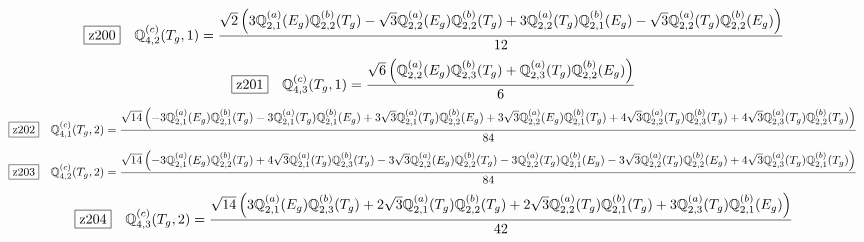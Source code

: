 \documentclass[fleqn,10pt,landscape]{jsarticle}
\begin{document}
\begin{dmath*}
\hspace*{3mm}\fbox{z200}\quad \mathbb{Q}_{4,2}^{(c)}(T_{g},1)=\frac{\sqrt{2} \left(3 \mathbb{Q}_{2,1}^{(a)}(E_{g}) \mathbb{Q}_{2,2}^{(b)}(T_{g}) - \sqrt{3} \mathbb{Q}_{2,2}^{(a)}(E_{g}) \mathbb{Q}_{2,2}^{(b)}(T_{g}) + 3 \mathbb{Q}_{2,2}^{(a)}(T_{g}) \mathbb{Q}_{2,1}^{(b)}(E_{g}) - \sqrt{3} \mathbb{Q}_{2,2}^{(a)}(T_{g}) \mathbb{Q}_{2,2}^{(b)}(E_{g})\right)}{12}
\end{dmath*}
\begin{dmath*}
\hspace*{3mm}\fbox{z201}\quad \mathbb{Q}_{4,3}^{(c)}(T_{g},1)=\frac{\sqrt{6} \left(\mathbb{Q}_{2,2}^{(a)}(E_{g}) \mathbb{Q}_{2,3}^{(b)}(T_{g}) + \mathbb{Q}_{2,3}^{(a)}(T_{g}) \mathbb{Q}_{2,2}^{(b)}(E_{g})\right)}{6}
\end{dmath*}
\begin{dmath*}
\hspace*{3mm}\fbox{z202}\quad \mathbb{Q}_{4,1}^{(c)}(T_{g},2)=\frac{\sqrt{14} \left(- 3 \mathbb{Q}_{2,1}^{(a)}(E_{g}) \mathbb{Q}_{2,1}^{(b)}(T_{g}) - 3 \mathbb{Q}_{2,1}^{(a)}(T_{g}) \mathbb{Q}_{2,1}^{(b)}(E_{g}) + 3 \sqrt{3} \mathbb{Q}_{2,1}^{(a)}(T_{g}) \mathbb{Q}_{2,2}^{(b)}(E_{g}) + 3 \sqrt{3} \mathbb{Q}_{2,2}^{(a)}(E_{g}) \mathbb{Q}_{2,1}^{(b)}(T_{g}) + 4 \sqrt{3} \mathbb{Q}_{2,2}^{(a)}(T_{g}) \mathbb{Q}_{2,3}^{(b)}(T_{g}) + 4 \sqrt{3} \mathbb{Q}_{2,3}^{(a)}(T_{g}) \mathbb{Q}_{2,2}^{(b)}(T_{g})\right)}{84}
\end{dmath*}
\begin{dmath*}
\hspace*{3mm}\fbox{z203}\quad \mathbb{Q}_{4,2}^{(c)}(T_{g},2)=\frac{\sqrt{14} \left(- 3 \mathbb{Q}_{2,1}^{(a)}(E_{g}) \mathbb{Q}_{2,2}^{(b)}(T_{g}) + 4 \sqrt{3} \mathbb{Q}_{2,1}^{(a)}(T_{g}) \mathbb{Q}_{2,3}^{(b)}(T_{g}) - 3 \sqrt{3} \mathbb{Q}_{2,2}^{(a)}(E_{g}) \mathbb{Q}_{2,2}^{(b)}(T_{g}) - 3 \mathbb{Q}_{2,2}^{(a)}(T_{g}) \mathbb{Q}_{2,1}^{(b)}(E_{g}) - 3 \sqrt{3} \mathbb{Q}_{2,2}^{(a)}(T_{g}) \mathbb{Q}_{2,2}^{(b)}(E_{g}) + 4 \sqrt{3} \mathbb{Q}_{2,3}^{(a)}(T_{g}) \mathbb{Q}_{2,1}^{(b)}(T_{g})\right)}{84}
\end{dmath*}
\begin{dmath*}
\hspace*{3mm}\fbox{z204}\quad \mathbb{Q}_{4,3}^{(c)}(T_{g},2)=\frac{\sqrt{14} \left(3 \mathbb{Q}_{2,1}^{(a)}(E_{g}) \mathbb{Q}_{2,3}^{(b)}(T_{g}) + 2 \sqrt{3} \mathbb{Q}_{2,1}^{(a)}(T_{g}) \mathbb{Q}_{2,2}^{(b)}(T_{g}) + 2 \sqrt{3} \mathbb{Q}_{2,2}^{(a)}(T_{g}) \mathbb{Q}_{2,1}^{(b)}(T_{g}) + 3 \mathbb{Q}_{2,3}^{(a)}(T_{g}) \mathbb{Q}_{2,1}^{(b)}(E_{g})\right)}{42}
\end{dmath*}
\end{document}
